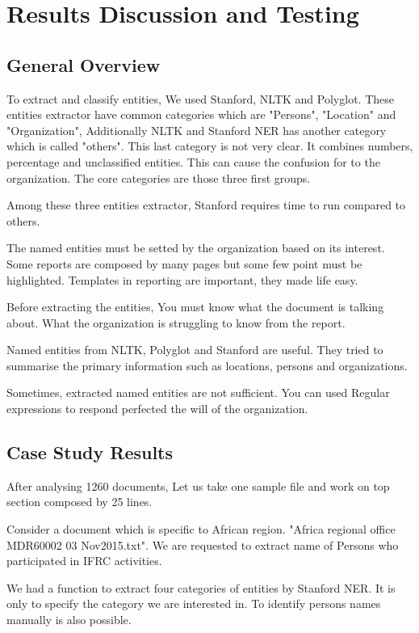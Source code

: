 \chapter{Results Discussion and Testing}
\section{General Overview}
To extract and classify entities, We used Stanford, NLTK and Polyglot. These entities extractor have common categories which are "Persons", "Location" and "Organization", Additionally NLTK and Stanford NER has another category which is called "others". This last category is not very clear. It combines numbers, percentage and unclassified entities. This can cause the confusion for to the organization. The core categories are those three first groups.

Among these three entities extractor, Stanford requires time to run compared to others.

The named entities must be setted by the organization based on its interest. Some reports are composed by many pages but some few point must be highlighted. Templates in reporting are important, they made life easy.

Before extracting the entities, You must know what the document is  talking about. What the organization is struggling to know from the report.


Named entities from NLTK, Polyglot and Stanford are useful. They tried to summarise the primary information such as locations, persons and organizations. 

Sometimes, extracted named entities are not sufficient. You can  used Regular expressions to respond perfected the will of the organization.

\section{Case Study Results}
After analysing 1260 documents, Let us take one sample file and work on top section composed by 25 lines.

Consider a document which is specific to African region. "Africa regional office MDR60002 03 Nov2015.txt". We are requested to extract name of Persons who participated in IFRC activities.

We had a function to extract four categories of entities by Stanford NER. It is only to specify the category we are interested in. To identify persons names manually is also possible.

